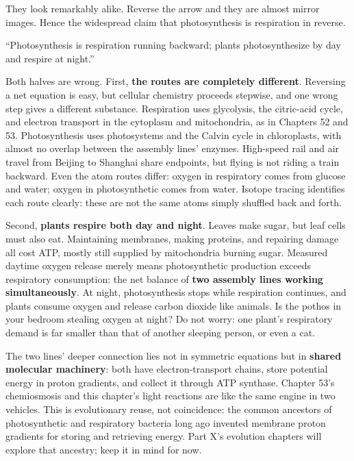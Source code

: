 They look remarkably alike. Reverse the arrow and they are almost mirror images. Hence the widespread claim that photosynthesis is respiration in reverse.

\begin{wuqu}
``Photosynthesis is respiration running backward; plants photosynthesize by day and respire at night.''

Both halves are wrong. First, \textbf{the routes are completely different}. Reversing a net equation is easy, but cellular chemistry proceeds stepwise, and one wrong step gives a different substance. Respiration uses glycolysis, the citric-acid cycle, and electron transport in the cytoplasm and mitochondria, as in Chapters 52 and 53. Photosynthesis uses photosystems and the Calvin cycle in chloroplasts, with almost no overlap between the assembly lines' enzymes. High-speed rail and air travel from Beijing to Shanghai share endpoints, but flying is not riding a train backward. Even the atom routes differ: oxygen in respiratory  comes from glucose and water; oxygen in photosynthetic  comes from water. Isotope tracing identifies each route clearly: these are not the same atoms simply shuffled back and forth.

Second, \textbf{plants respire both day and night}. Leaves make sugar, but leaf cells must also eat. Maintaining membranes, making proteins, and repairing damage all cost ATP, mostly still supplied by mitochondria burning sugar. Measured daytime oxygen release merely means photosynthetic production exceeds respiratory consumption: the net balance of \textbf{two assembly lines working simultaneously}. At night, photosynthesis stops while respiration continues, and plants consume oxygen and release carbon dioxide like animals. Is the pothos in your bedroom stealing oxygen at night? Do not worry: one plant's respiratory demand is far smaller than that of another sleeping person, or even a cat.
\end{wuqu}

The two lines' deeper connection lies not in symmetric equations but in \textbf{shared molecular machinery}: both have electron-transport chains, store potential energy in proton gradients, and collect it through ATP synthase. Chapter 53's chemiosmosis and this chapter's light reactions are like the same engine in two vehicles. This is evolutionary reuse, not coincidence: the common ancestors of photosynthetic and respiratory bacteria long ago invented membrane proton gradients for storing and retrieving energy. Part X's evolution chapters will explore that ancestry; keep it in mind for now.

